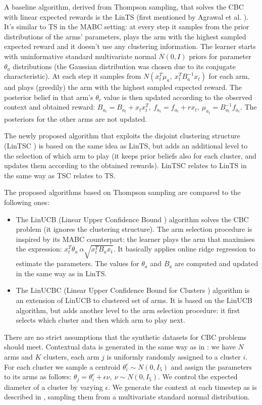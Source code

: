 A baseline algorithm, derived from Thompson sampling, that solves the CBC with linear expected rewards is the LinTS (first mentioned by Agrawal et al. \cite{agrawal}). It's similar to TS in the MABC setting: at every step it samples from the prior distributions of the arms' parameters, plays the arm with the highest sampled expected reward and it doesn't use any clustering information. The learner starts with uninformative standard multivariate normal $N(0, I)$ priors for parameter $\theta_a$ distributions (the Gaussian distribution was chosen due to its conjugate characteristic). At each step it samples from $N(x_t^T \mu_a,\ x_t^T B_a^{-1} x_t)$ for each arm, and plays (greedily) the arm with the highest sampled expected reward. The posterior belief in that arm's $\theta_c$ value is then updated according to the observed context and obtained reward: $B_{a_t} = B_{a_t} + x_t x_t^T,\ f_{a_t} = f_{a_t} + r x_t,\ \mu_{a_t} = B_{a_t}^{-1} f_{a_t}$. The posteriors for the other arms are not updated.

The newly proposed algorithm that exploits the disjoint clustering structure (LinTSC \cite{bandits}) is based on the same idea as LinTS, but adds an additional level to the selection of which arm to play (it keeps prior beliefs also for each cluster, and updates them according to the obtained rewards). LinTSC relates to LinTS in the same way as TSC relates to TS.

The proposed algorithms based on Thompson sampling are compared to the following ones:

\begin{itemize}
  \item The LinUCB (Linear Upper Confidence Bound \cite{li}) algorithm solves the CBC problem (it ignores the clustering structure). The arm selection procedure is inspired by its MABC counterpart: the learner plays the arm that maximises the expression: $x_t^T \theta_a \ \alpha \sqrt{x_t^T B_a x_t}$. It basically applies online ridge regression to estimate the parameters. The values for $\theta_a$ and $B_a$ are computed and updated in the same way as in LinTS. 
  \item The LinUCBC (Linear Upper Confidence Bound for Clusters \cite{bouneffouf}) algorithm is an extension of LinUCB to clustered set of arms. It is based on the LinUCB algorithm, but adds another level to the arm selection procedure: it first selects which cluster and then which arm to play next.
\end{itemize}

There are no strict assumptions that the synthetic datasets for CBC problems should meet. Contextual data is generated in the same way as in \cite{bouneffouf}: we have $N$ arms and $K$ clusters, each arm $j$ is uniformly randomly assigned to a cluster $i$. For each cluster we sample a centroid $\theta_i^c \sim N(0, I_5)$ and assign the parameters to its arms as follows: $\theta_j = \theta_i^c + \epsilon \nu,\ \nu \sim N(0, I_5)$. We control the expected diameter of a cluster by varying $\epsilon$. We generate the context at each timestep as is described in \cite{bouneffouf}, sampling them from a multivariate standard normal distribution.

